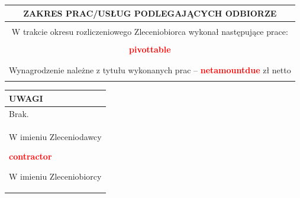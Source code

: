 \documentclass{article}
\newcommand{\rowspace}{
    \begin{minipage}[c][2em][t]{0pt}\end{minipage}
}
\newcommand{\VAR}[1]{
    \textbf{\textcolor{red}{#1}}
}
\begin{document}
    \begin{adjustbox}{width=1\textwidth,center}
        \begin{tabular}{|c|}
            \cellcolor[gray]{0.8}\rowspace ZAKRES PRAC/USŁUG PODLEGAJĄCYCH ODBIORZE \\
            \hline
            \\
            W trakcie okresu rozliczeniowego Zleceniobiorca wykonał następujące prace: \\
            \\
            \VAR{pivottable}
            \\
            \\
            \\
            Wynagrodzenie należne z tytułu wykonanych prac – \VAR{netamountdue} zł netto \\
            \\
            \hline
        \end{tabular}
    \end{adjustbox}

    \newpage

    \begin{tabularx}{\textwidth}{|X|}
        \hline
        \cellcolor[gray]{0.8}\rowspace \centerline{UWAGI} \\
        \hline
        \rowspace Brak. \\
        \hline
        \vspace{6em}
        \begin{minipage}{0.49\textwidth}\centering \phantom{X} \par \dotfill \par W imieniu Zleceniodawcy \end{minipage}
        \begin{minipage}{0.49\textwidth}\centering \VAR{contractor} \par \dotfill \par W imieniu Zleceniobiorcy \end{minipage} \par \\
        \hline
    \end{tabularx}
\end{document}
